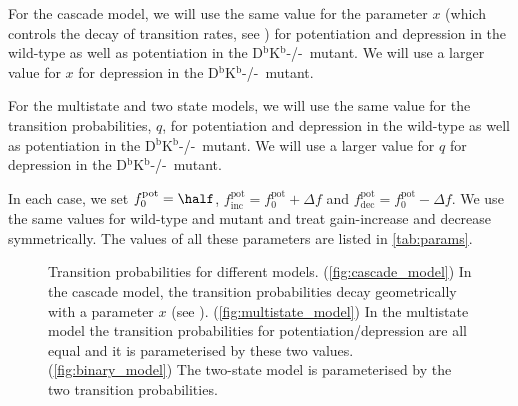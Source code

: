 \documentclass[12pt]{article}
\newcommand{\pot}{^{\text{pot}}}
\newcommand{\norm}{_0}
\newcommand{\inc}{_{\text{inc}}}
\newcommand{\dec}{_{\text{dec}}}
\newcommand{\KO}{D$^\mathrm{b}$K$^\mathrm{b}$-/-}
\begin{document}
For the cascade model, we will use the same value for the parameter $x$ (which controls the decay of transition rates, see \cite{Fusi2005cascade}) for potentiation and depression in the wild-type as well as potentiation in the \KO\ mutant.
We will use a larger value for $x$ for depression in the \KO\ mutant.

For the multistate and two state models, we will use the same value for the transition probabilities, $q$, for potentiation and depression in the wild-type as well as potentiation in the \KO\ mutant.
We will use a larger value for $q$ for depression in the \KO\ mutant.

In each case, we set $f\pot\norm=\half$, $f\pot\inc=f\pot\norm+\Delta f$ and $f\pot\dec=f\pot\norm-\Delta f$.
We use the same values for wild-type and mutant and treat gain-increase and decrease symmetrically.
The values of all these parameters are listed in \autoref{tab:params}.

\begin{figure}
 \begin{center}
 \begin{myenuma}
  \item{}\label{fig:cascade_model}\hspace{0.5cm}
  \item{}\label{fig:multistate_model}\hspace{0.5cm}
  \item{}\label{fig:binary_model}
 \end{myenuma}
 \end{center}
  \caption[Transition probabilities for different models]{Transition probabilities for different models.
  (\ref{fig:cascade_model}) In the cascade model, the transition probabilities decay geometrically with a parameter $x$ (see \cite{Fusi2005cascade}).
  (\ref{fig:multistate_model}) In the multistate model the transition probabilities for potentiation/depression are all equal and it is parameterised by these two values.
  (\ref{fig:binary_model}) The two-state model is parameterised by the two transition probabilities.} \label{fig:models}
\end{figure}
\end{document}
